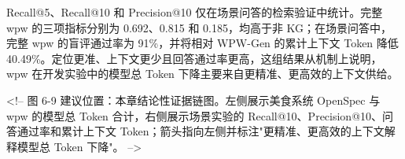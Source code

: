 Recall@5、Recall@10 和 Precision@10 仅在场景问答的检索验证中统计。完整 wpw 的三项指标分别为 0.692、0.815 和 0.185，均高于非 KG；在场景问答中，完整 wpw 的盲评通过率为 91\%，并将相对 WPW-Gen 的累计上下文 Token 降低 40.49\%。定位更准、上下文更少且回答通过率更高，这组结果从机制上说明，wpw 在开发实验中的模型总 Token 下降主要来自更精准、更高效的上下文供给。

<!-- 图 6-9 建议位置：本章结论性证据链图。左侧展示美食系统 OpenSpec 与 wpw 的模型总 Token 合计，右侧展示场景实验的 Recall@10、Precision@10、问答通过率和累计上下文 Token；箭头指向左侧并标注"更精准、更高效的上下文解释模型总 Token 下降"。 -->
